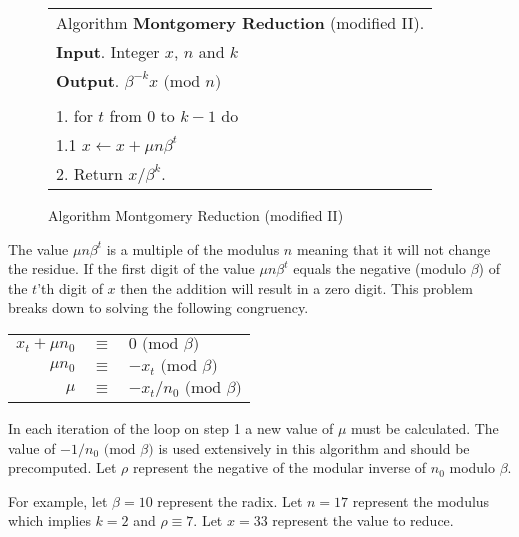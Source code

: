\documentclass[b5paper]{book}
\begin{document}
\begin{figure}[!here]
\begin{small}
\begin{center}
\begin{tabular}{l}
\hline Algorithm \textbf{Montgomery Reduction} (modified II). \\
\textbf{Input}.   Integer $x$, $n$ and $k$ \\
\textbf{Output}.  $\beta^{-k}x \mbox{ (mod }n\mbox{)}$ \\
\hline \\
1.  for $t$ from $0$ to $k - 1$ do \\
\hspace{3mm}1.1  $x \leftarrow x + \mu n \beta^t$ \\
2.  Return $x/\beta^k$. \\
\hline
\end{tabular}
\end{center}
\end{small}
\caption{Algorithm Montgomery Reduction (modified II)}
\end{figure}

The value $\mu n \beta^t$ is a multiple of the modulus $n$ meaning that it will not change the residue.  If the first digit of 
the value $\mu n \beta^t$ equals the negative (modulo $\beta$) of the $t$'th digit of $x$ then the addition will result in a zero digit.  This
problem breaks down to solving the following congruency.  

\begin{center}
\begin{tabular}{rcl}
$x_t + \mu n_0$ & $\equiv$ & $0 \mbox{ (mod }\beta\mbox{)}$ \\
$\mu n_0$ & $\equiv$ & $-x_t \mbox{ (mod }\beta\mbox{)}$ \\
$\mu$ & $\equiv$ & $-x_t/n_0 \mbox{ (mod }\beta\mbox{)}$ \\
\end{tabular}
\end{center}

In each iteration of the loop on step 1 a new value of $\mu$ must be calculated.  The value of $-1/n_0 \mbox{ (mod }\beta\mbox{)}$ is used 
extensively in this algorithm and should be precomputed.  Let $\rho$ represent the negative of the modular inverse of $n_0$ modulo $\beta$.  

For example, let $\beta = 10$ represent the radix.  Let $n = 17$ represent the modulus which implies $k = 2$ and $\rho \equiv 7$.  Let $x = 33$ 
represent the value to reduce.
\end{document}
